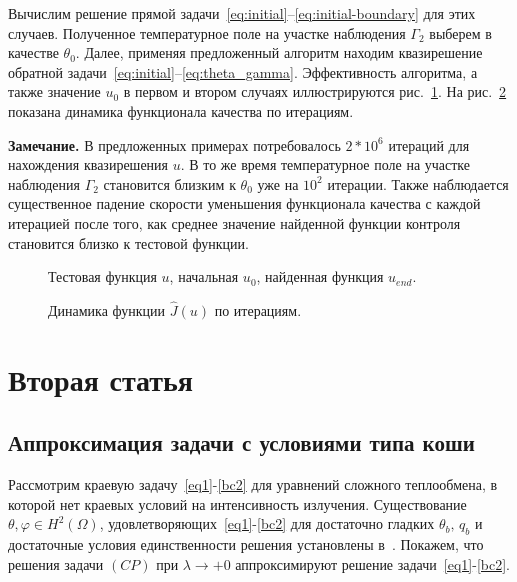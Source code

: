 Вычислим решение прямой задачи~\eqref{eq:initial}--\eqref{eq:initial-boundary} для этих случаев.
Полученное температурное поле на участке наблюдения $\Gamma_2$ выберем в качестве $\theta_0$.
Далее, применяя предложенный алгоритм находим квазирешение
обратной задачи~\eqref{eq:initial}--\eqref{eq:theta_gamma}.
Эффективность алгоритма, а также значение $u_0$ в первом и
втором случаях иллюстрируются рис.~\ref{fig:control}.
На рис.~\ref{fig:cost} показана динамика функционала качества по итерациям.

\textbf{Замечание.} В предложенных примерах потребовалось $2*10^6$ итераций для нахождения квазирешения $u$.
В то же время температурное поле на участке наблюдения $\Gamma_2$ становится близким
к $\theta_0$ уже на $10^2$ итерации.
Также наблюдается существенное падение скорости уменьшения функционала качества с
каждой итерацией после того, как среднее значение найденной функции контроля
становится близко к тестовой функции.
\begin{figure}[H]
    \centering
    \caption{Тестовая функция $u$, начальная $u_0$, найденная функция $u_{end}.$}
    \label{fig:control}
\end{figure}

\begin{figure}[H]
    \centering
    \caption{Динамика функции $\hat{J}(u)$ по итерациям.}
    \label{fig:cost}
\end{figure}

\clearpage


\section{Вторая статья}\label{sec:ch3/sec2}

\subsection{Аппроксимация задачи с условиями типа коши}\label{subsec:ch3/3_1}
Рассмотрим краевую задачу~\eqref{eq1}-\eqref{bc2} для уравнений сложного теплообмена, в которой нет краевых условий на
интенсивность излучения.
Существование $\theta,\varphi\in H^2(\Omega)$, удовлетворяющих~\eqref{eq1}-\eqref{bc2}
для достаточно гладких
$\theta_b,\, q_b$ и достаточные условия единственности решения
установлены в~\cite{CMMP20}.
Покажем, что решения задачи $(CP)$ при $\lambda\to+0$
аппроксимируют решение задачи~\eqref{eq1}-\eqref{bc2}.


